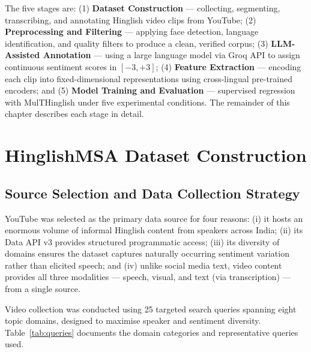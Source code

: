The five stages are: (1) \textbf{Dataset Construction} — collecting, segmenting, transcribing, and annotating Hinglish video clips from YouTube; (2) \textbf{Preprocessing and Filtering} — applying face detection, language identification, and quality filters to produce a clean, verified corpus; (3) \textbf{LLM-Assisted Annotation} — using a large language model via Groq API to assign continuous sentiment scores in $[-3, +3]$; (4) \textbf{Feature Extraction} — encoding each clip into fixed-dimensional representations using cross-lingual pre-trained encoders; and (5) \textbf{Model Training and Evaluation} — supervised regression with MulTHinglish under five experimental conditions. The remainder of this chapter describes each stage in detail.

\section{HinglishMSA Dataset Construction}

\subsection{Source Selection and Data Collection Strategy}

YouTube was selected as the primary data source for four reasons: (i) it hosts an enormous volume of informal Hinglish content from speakers across India; (ii) its Data API v3 provides structured programmatic access; (iii) its diversity of domains ensures the dataset captures naturally occurring sentiment variation rather than elicited speech; and (iv) unlike social media text, video content provides all three modalities — speech, visual, and text (via transcription) — from a single source.

Video collection was conducted using 25 targeted search queries spanning eight topic domains, designed to maximise speaker and sentiment diversity. Table~\ref{tab:queries} documents the domain categories and representative queries used.

